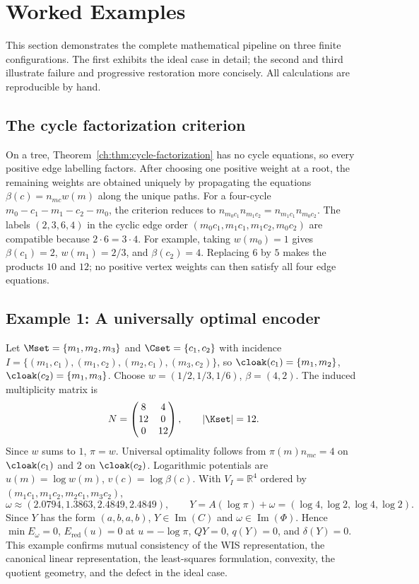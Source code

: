 \chapter[Worked Examples]{Worked Examples}\label{ch:sec:examples}
This section demonstrates the complete mathematical pipeline on three
finite configurations.  The first exhibits the ideal case in detail;
the second and third illustrate failure and progressive restoration
more concisely.  All calculations are reproducible by hand.
\section{The cycle factorization criterion}
On a tree, Theorem~\ref{ch:thm:cycle-factorization} has no cycle equations,
so every positive edge labelling factors.  After choosing one positive
weight at a root, the remaining weights are obtained uniquely by
propagating the equations $\beta(c)=n_{mc}w(m)$ along the unique paths.
For a four-cycle
$m_0-c_1-m_1-c_2-m_0$, the criterion reduces to $n_{m_0c_1}n_{m_1c_2}=n_{m_1c_1}n_{m_0c_2}.$ The labels $(2,3,6,4)$ in the cyclic edge order
$(m_0c_1,m_1c_1,m_1c_2,m_0c_2)$ are compatible because
$2\cdot6=3\cdot4$.  For example, taking $w(m_0)=1$ gives
$\beta(c_1)=2$, $w(m_1)=2/3$, and $\beta(c_2)=4$.
Replacing $6$ by $5$ makes the products $10$ and $12$; no positive
vertex weights can then satisfy all four edge equations.
\section{Example 1: A universally optimal encoder}
Let $\Mset=\{m_1,m_2,m_3\}$ and $\Cset=\{c_1,c_2\}$ with incidence
$I=\{(m_1,c_1),(m_1,c_2),(m_2,c_1),(m_3,c_2)\}$, so
$\cloak(c_1)=\{m_1,m_2\}$, $\cloak(c_2)=\{m_1,m_3\}$.  Choose
$w=(1/2,1/3,1/6)$, $\beta=(4,2)$.  The induced multiplicity matrix is
\[
N=\begin{pmatrix}8&4\\12&0\\0&12\end{pmatrix},
\qquad |\Kset|=12.
\]
Since $w$ sums to $1$, $\pi=w$.  Universal optimality follows from
$\pi(m)n_{mc}=4$ on $\cloak(c_1)$ and $2$ on $\cloak(c_2)$.
Logarithmic potentials are $u(m)=\log w(m)$, $v(c)=\log\beta(c)$.
With $V_I=\mathbb R^4$ ordered by $(m_1c_1,m_1c_2,m_2c_1,m_3c_2)$,
\[
\omega \approx (2.0794,1.3863,2.4849,2.4849),\qquad
Y = A(\log\pi)+\omega = (\log4,\log2,\log4,\log2).
\]
Since $Y$ has the form $(a,b,a,b)$, $Y\in\operatorname{Im}(C)$ and
$\omega\in\operatorname{Im}(\Phi)$.  Hence $\min E_\omega=0$,
$E_{\mathrm{red}}(u)=0$ at $u=-\log\pi$, $QY=0$, $q(Y)=0$, and
$\delta(Y)=0$.
This example confirms mutual consistency of the WIS representation, the
canonical linear representation, the least-squares formulation,
convexity, the quotient geometry, and the defect in the ideal case.
